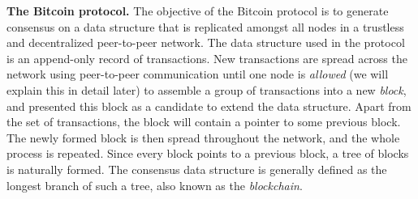 


\smallskip
\noindent
{\bf The Bitcoin protocol.} The objective of the Bitcoin protocol is to generate consensus on a data structure that is replicated amongst all nodes in a trustless 
and decentralized peer-to-peer network. The data structure used in the protocol is an append-only record of transactions. New transactions are spread across the network using peer-to-peer communication until one node is \emph{allowed} (we will explain this in detail later) to assemble a group of transactions into a new \emph{block}, and presented this block as a candidate to extend the data structure. Apart from the set of transactions, the block will contain a pointer to some previous block. The newly formed block is then spread throughout the network, and the whole process is repeated. Since every block points to a previous block, a tree of blocks is naturally formed. The consensus data structure is generally defined as the longest branch of such a tree, also known as the \emph{blockchain}.


